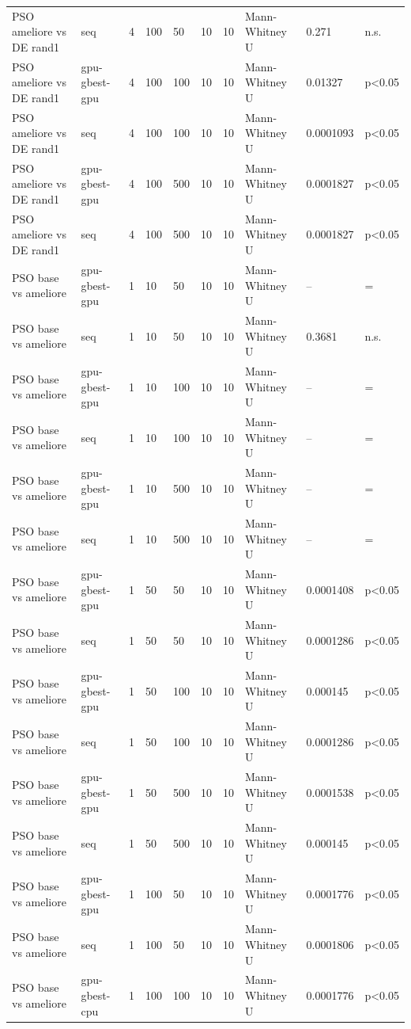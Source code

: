 \begin{table}[t]
\begin{tabular}{llllllllll}
PSO ameliore vs DE rand1 & seq & 4 & 100 & 50 & 10 & 10 & Mann-Whitney U & 0.271 & n.s. \\
PSO ameliore vs DE rand1 & gpu-gbest-gpu & 4 & 100 & 100 & 10 & 10 & Mann-Whitney U & 0.01327 & p<0.05 \\
PSO ameliore vs DE rand1 & seq & 4 & 100 & 100 & 10 & 10 & Mann-Whitney U & 0.0001093 & p<0.05 \\
PSO ameliore vs DE rand1 & gpu-gbest-gpu & 4 & 100 & 500 & 10 & 10 & Mann-Whitney U & 0.0001827 & p<0.05 \\
PSO ameliore vs DE rand1 & seq & 4 & 100 & 500 & 10 & 10 & Mann-Whitney U & 0.0001827 & p<0.05 \\
PSO base vs ameliore & gpu-gbest-gpu & 1 & 10 & 50 & 10 & 10 & Mann-Whitney U & -- & = \\
PSO base vs ameliore & seq & 1 & 10 & 50 & 10 & 10 & Mann-Whitney U & 0.3681 & n.s. \\
PSO base vs ameliore & gpu-gbest-gpu & 1 & 10 & 100 & 10 & 10 & Mann-Whitney U & -- & = \\
PSO base vs ameliore & seq & 1 & 10 & 100 & 10 & 10 & Mann-Whitney U & -- & = \\
PSO base vs ameliore & gpu-gbest-gpu & 1 & 10 & 500 & 10 & 10 & Mann-Whitney U & -- & = \\
PSO base vs ameliore & seq & 1 & 10 & 500 & 10 & 10 & Mann-Whitney U & -- & = \\
PSO base vs ameliore & gpu-gbest-gpu & 1 & 50 & 50 & 10 & 10 & Mann-Whitney U & 0.0001408 & p<0.05 \\
PSO base vs ameliore & seq & 1 & 50 & 50 & 10 & 10 & Mann-Whitney U & 0.0001286 & p<0.05 \\
PSO base vs ameliore & gpu-gbest-gpu & 1 & 50 & 100 & 10 & 10 & Mann-Whitney U & 0.000145 & p<0.05 \\
PSO base vs ameliore & seq & 1 & 50 & 100 & 10 & 10 & Mann-Whitney U & 0.0001286 & p<0.05 \\
PSO base vs ameliore & gpu-gbest-gpu & 1 & 50 & 500 & 10 & 10 & Mann-Whitney U & 0.0001538 & p<0.05 \\
PSO base vs ameliore & seq & 1 & 50 & 500 & 10 & 10 & Mann-Whitney U & 0.000145 & p<0.05 \\
PSO base vs ameliore & gpu-gbest-gpu & 1 & 100 & 50 & 10 & 10 & Mann-Whitney U & 0.0001776 & p<0.05 \\
PSO base vs ameliore & seq & 1 & 100 & 50 & 10 & 10 & Mann-Whitney U & 0.0001806 & p<0.05 \\
PSO base vs ameliore & gpu-gbest-cpu & 1 & 100 & 100 & 10 & 10 & Mann-Whitney U & 0.0001776 & p<0.05 \\

\end{tabular}
\end{table}
